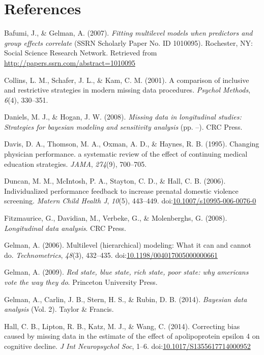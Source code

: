 \documentclass[]{article}
\begin{document}
\section*{References}\label{references}

Bafumi, J., \& Gelman, A. (2007). \emph{Fitting multilevel models when
predictors and group effects correlate} (SSRN Scholarly Paper No. ID
1010095). Rochester, NY: Social Science Research Network. Retrieved from
\url{http://papers.ssrn.com/abstract=1010095}

Collins, L. M., Schafer, J. L., \& Kam, C. M. (2001). A comparison of
inclusive and restrictive strategies in modern missing data procedures.
\emph{Psychol Methods}, \emph{6}(4), 330--351.

Daniels, M. J., \& Hogan, J. W. (2008). \emph{Missing data in
longitudinal studies: Strategies for bayesian modeling and sensitivity
analysis} (pp. --). CRC Press.

Davis, D. A., Thomson, M. A., Oxman, A. D., \& Haynes, R. B. (1995).
Changing physician performance. a systematic review of the effect of
continuing medical education strategies. \emph{JAMA}, \emph{274}(9),
700--705.

Duncan, M. M., McIntosh, P. A., Stayton, C. D., \& Hall, C. B. (2006).
Individualized performance feedback to increase prenatal domestic
violence screening. \emph{Matern Child Health J}, \emph{10}(5),
443--449.
doi:\href{http://dx.doi.org/10.1007/s10995-006-0076-0}{10.1007/s10995-006-0076-0}

Fitzmaurice, G., Davidian, M., Verbeke, G., \& Molenberghs, G. (2008).
\emph{Longitudinal data analysis}. CRC Press.

Gelman, A. (2006). Multilevel (hierarchical) modeling: What it can and
cannot do. \emph{Technometrics}, \emph{48}(3), 432--435.
doi:\href{http://dx.doi.org/10.1198/004017005000000661}{10.1198/004017005000000661}

Gelman, A. (2009). \emph{Red state, blue state, rich state, poor state:
why americans vote the way they do}. Princeton University Press.

Gelman, A., Carlin, J. B., Stern, H. S., \& Rubin, D. B. (2014).
\emph{Bayesian data analysis} (Vol. 2). Taylor \& Francis.

Hall, C. B., Lipton, R. B., Katz, M. J., \& Wang, C. (2014). Correcting
bias caused by missing data in the estimate of the effect of
apolipoprotein epsilon 4 on cognitive decline. \emph{J Int Neuropsychol
Soc}, 1--6.
doi:\href{http://dx.doi.org/10.1017/S1355617714000952}{10.1017/S1355617714000952}
\end{document}
